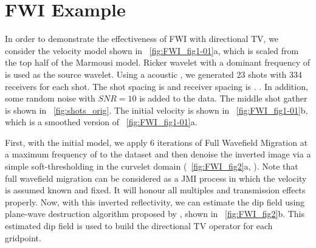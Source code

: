 \section{FWI Example}
In order to demonstrate the effectiveness of FWI with directional TV, we consider the velocity model shown in ~\ref{fig:FWI_fig1-01}a, which is scaled from the top half of the Marmousi model.  Ricker wavelet with a dominant frequency of  is used as the source wavelet. Using a  acoustic , we generated 23 shots with 334 receivers for each shot. The shot spacing is  and  receiver spacing is . . In addition, some random noise with $SNR = 10$ is added to the  data. The middle shot gather is shown in ~\ref{fig:shots_orig}. The initial velocity  is shown in ~\ref{fig:FWI_fig1-01}b, which is a smoothed version of ~\ref{fig:FWI_fig1-01}a.

First, with the initial model, we apply 6 iterations of Full Wavefield Migration  \citep{Berkhout14b,davydenko2016full} at a maximum frequency of  to the dataset and then denoise the inverted image via a simple soft-thresholding in the curvelet domain (~\ref{fig:FWI_fig2}a, \cite{donoho1995noising}). Note that full wavefield  migration can be considered as a JMI process in which the velocity is assumed known and fixed. It will honour all multiples and transmission effects properly. Now, with this inverted reflectivity, we can estimate the dip field using plane-wave destruction algorithm proposed by \cite{fomel2002applications}, shown in ~\ref{fig:FWI_fig2}b. This estimated dip field is used to build the directional TV operator for each gridpoint.

